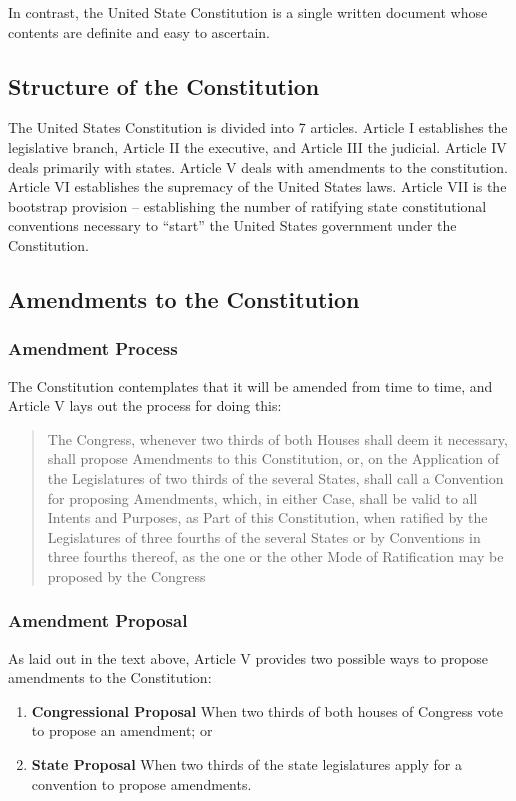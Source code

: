 In contrast, the United State Constitution is a single written document whose contents are definite and easy to ascertain.

\subsection{Structure of the Constitution}
The United States Constitution is divided into 7 articles.  Article I establishes the legislative branch, Article II the executive, and Article III the judicial.  Article IV deals primarily with states.  Article V deals with amendments to the constitution.  Article VI establishes the supremacy of the United States laws.  Article VII is the bootstrap provision -- establishing the number of ratifying state constitutional conventions necessary to ``start'' the United States government under the Constitution.

\subsection{Amendments to the Constitution}
\subsubsection{Amendment Process}
The Constitution contemplates that it will be amended from time to time, and Article V lays out the process for doing this:

\begin{quote}
The Congress, whenever two thirds of both Houses shall deem it necessary, shall propose Amendments to this Constitution, or, on the Application of the Legislatures of two thirds of the several States, shall call a Convention for proposing Amendments, which, in either Case, shall be valid to all Intents and Purposes, as Part of this Constitution, when ratified by the Legislatures of three fourths of the several States or by Conventions in three fourths thereof, as the one or the other Mode of Ratification may be proposed by the Congress
\end{quote}

\subsubsection{Amendment Proposal}
As laid out in the text above, Article V provides two possible ways to propose amendments to the Constitution:
\begin{enumerate}
\item \textbf{Congressional Proposal} When two thirds of both houses of Congress vote to propose an amendment; or
\item \textbf{State Proposal} When two thirds of the state legislatures apply for a convention to propose amendments.
\end{enumerate}

